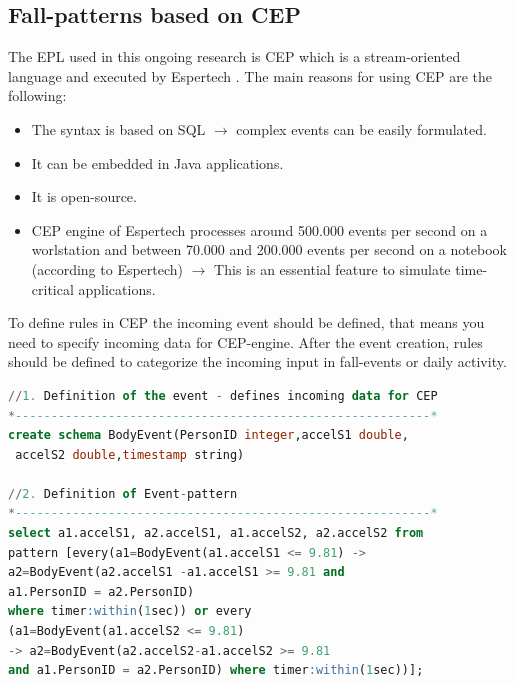 \documentclass[review]{elsarticle}
\begin{document}
\subsection{Fall-patterns based on CEP}
\label{subsec:CEP}
The EPL used in this ongoing research is CEP which is a stream-oriented language and  executed by Espertech \cite{Esper:2016}. The main reasons for using CEP are the following:
\begin{itemize}
	\item The syntax is based on SQL $\rightarrow$ complex events can be easily formulated.
	\item It can be embedded in Java applications.
	\item It is open-source.
	\item CEP engine of Espertech processes around 500.000 events per second on a worlstation and between 70.000 and 200.000 events per second on a notebook (according to Espertech) $\rightarrow$ This is an essential feature to simulate time-critical applications. 
\end{itemize}
To define rules in CEP the incoming event should be
defined, that means you need to specify incoming data for CEP-engine.
After the event creation, rules should be defined to categorize	the incoming input in fall-events or daily activity.

 \renewcommand{\lstlistingname}{Example}
\begin{lstlisting}[basicstyle=\ttfamily\footnotesize,language=SQL,caption=Fall pattern based on Kozina et al. \cite{Kozina},label=CEPPattern]
//1. Definition of the event - defines incoming data for CEP
*----------------------------------------------------------*
create schema BodyEvent(PersonID integer,accelS1 double,
 accelS2 double,timestamp string)

//2. Definition of Event-pattern
*----------------------------------------------------------*
select a1.accelS1, a2.accelS1, a1.accelS2, a2.accelS2 from 
pattern [every(a1=BodyEvent(a1.accelS1 <= 9.81) -> 
a2=BodyEvent(a2.accelS1 -a1.accelS1 >= 9.81 and 
a1.PersonID = a2.PersonID) 
where timer:within(1sec)) or every 
(a1=BodyEvent(a1.accelS2 <= 9.81)
-> a2=BodyEvent(a2.accelS2-a1.accelS2 >= 9.81
and a1.PersonID = a2.PersonID) where timer:within(1sec))];
\end{lstlisting}
\end{document}
